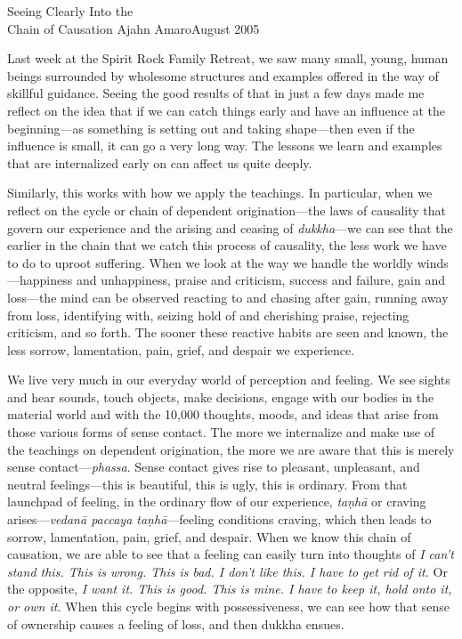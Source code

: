 {Seeing Clearly Into the\\Chain of Causation}
{Ajahn Amaro}{August 2005}

Last week at the Spirit Rock Family Retreat, we saw many small, young, 
human beings surrounded by wholesome structures and examples offered in 
the way of skillful guidance. Seeing the good results of that in just a 
few days made me reflect on the idea that if we can catch things early 
and have an influence at the beginning---as something is setting out 
and taking shape---then even if the influence is small, it can go a 
very long way. The lessons we learn and examples that are internalized 
early on can affect us quite deeply.

Similarly, this works with how we apply the teachings. In particular, 
when we reflect on the cycle or chain of dependent origination---the 
laws of causality that govern our experience and the arising and 
ceasing of \emph{dukkha}---we can see that the earlier in the chain 
that we catch this process of causality, the less work we have to do to 
uproot suffering. When we look at the way we handle the worldly 
winds---happiness and unhappiness, praise and criticism, success and 
failure, gain and loss---the mind can be observed reacting to and 
chasing after gain, running away from loss, identifying with, seizing 
hold of and cherishing praise, rejecting criticism, and so forth. The 
sooner these reactive habits are seen and known, the less sorrow, 
lamentation, pain, grief, and despair we experience.

We live very much in our everyday world of perception and feeling. We 
see sights and hear sounds, touch objects, make decisions, engage with 
our bodies in the material world and with the 10,000 thoughts, moods, 
and ideas that arise from those various forms of sense contact. The 
more we internalize and make use of the teachings on dependent 
origination, the more we are aware that this is merely sense 
contact---\emph{phassa}. Sense contact gives rise to pleasant, 
unpleasant, and neutral feelings---this is beautiful, this is ugly, 
this is ordinary. From that launchpad of feeling, in the ordinary flow 
of our experience, \emph{taṇhā} or craving arises---\emph{vedanā 
paccaya taṇhā}---feeling conditions craving, which then leads to 
sorrow, lamentation, pain, grief, and despair. When we know this chain 
of causation, we are able to see that a feeling can easily turn into 
thoughts of \emph{I can't stand this. This is wrong. This is bad. I 
don't like this. I have to get rid of it.} Or the opposite, \emph{I 
want it. This is good. This is mine. I have to keep it, hold onto it, 
or own it.} When this cycle begins with possessiveness, we can see how 
that sense of ownership causes a feeling of loss, and then dukkha 
ensues.

